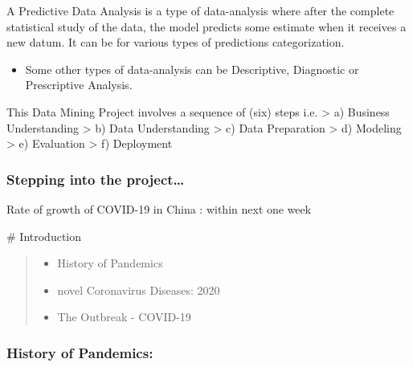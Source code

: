 \documentclass[11pt]{article}
\providecommand{\tightlist}{%
      \setlength{\itemsep}{0pt}\setlength{\parskip}{0pt}}
\begin{document}
    

     A Predictive Data Analysis is a type of data-analysis where after the
complete statistical study of the data, the model predicts some estimate
when it receives a new datum. It can be for various types of predictions
categorization.

\begin{itemize}
\tightlist
\item
  Some other types of data-analysis can be Descriptive, Diagnostic or
  Prescriptive Analysis.
\end{itemize}

This Data Mining Project involves a sequence of (six) steps i.e.
\textgreater{} a) Business Understanding \textgreater{} b) Data
Understanding \textgreater{} c) Data Preparation \textgreater{} d)
Modeling \textgreater{} e) Evaluation \textgreater{} f) Deployment 

    

    \hypertarget{stepping-into-the-project}{%
\subsubsection{Stepping into the
project\ldots{}}\label{stepping-into-the-project}}

    

    Rate of growth of COVID-19 in China : within next one week

    

     \# Introduction

\begin{quote}
\begin{itemize}
\tightlist
\item
  History of Pandemics
\item
  novel Coronavirus Diseases: 2020
\item
  The Outbreak - COVID-19
\end{itemize}
\end{quote}

    \hypertarget{history-of-pandemics}{%
\subsubsection{History of Pandemics:}\label{history-of-pandemics}}
\end{document}
